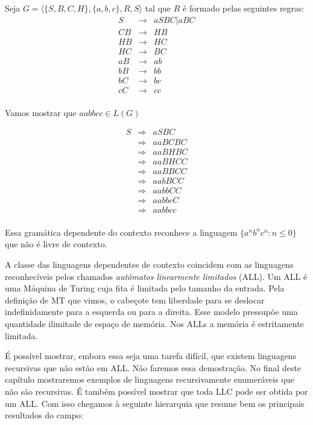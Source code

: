 \begin{example}
  Seja $G = \langle \{S, B, C, H \}, \{a,b,c\}, R, S \rangle$ tal que $R$ é formado pelas seguintes regras:
  \begin{eqnarray*}
    S  & \to & aSBC | aBC\\
    CB & \to & HB \\
    HB & \to & HC \\
    HC & \to & BC \\
    aB & \to & ab \\
    bB & \to & bb \\
    bC & \to & bc \\
    cC & \to & cc \\
  \end{eqnarray*}

  Vamos mostrar que $aabbcc \in L(G)$

  \begin{eqnarray*}
    S  & \Rightarrow & aSBC \\
       & \Rightarrow & aaBCBC \\
       & \Rightarrow & aaBHBC \\
       & \Rightarrow & aaBHCC \\
       & \Rightarrow & aaBBCC \\
       & \Rightarrow & aabBCC \\
       & \Rightarrow & aabbCC \\
       & \Rightarrow & aabbcC \\
       & \Rightarrow & aabbcc \\
  \end{eqnarray*}

  Essa gramática dependente do contexto reconhece a linguagem $\{a^nb^nc^n : n \leq 0\}$ que não é livre de contexto.
\end{example}

A classe das linguagens dependentes de contexto coincidem com as linguagens reconhecíveis pelos chamados {\em autômatos linearmente limitados} (ALL).
Um ALL é uma Máquina de Turing cuja fita é limitada pelo tamanho da entrada.
Pela definição de MT que vimos, o cabeçote tem liberdade para se deslocar indefinidamente para a esquerda ou para a direita.
Esse modelo pressupõe uma quantidade ilimitade de espaço de memória.
Nos ALLs a memória é estritamente limitada.

É possível mostrar, embora essa seja uma tarefa difícil, que existem linguagens recursivas que não estão em ALL.
Não faremos essa demostração.
No final deste capítulo mostraremos exemplos de linguagens recursivamente enumeráveis que não são recursivas.
É também possível mostrar que toda LLC pode ser obtida por um ALL.
Com isso chegamos à seguinte hierarquia que resume bem os principais resultados do campo:

